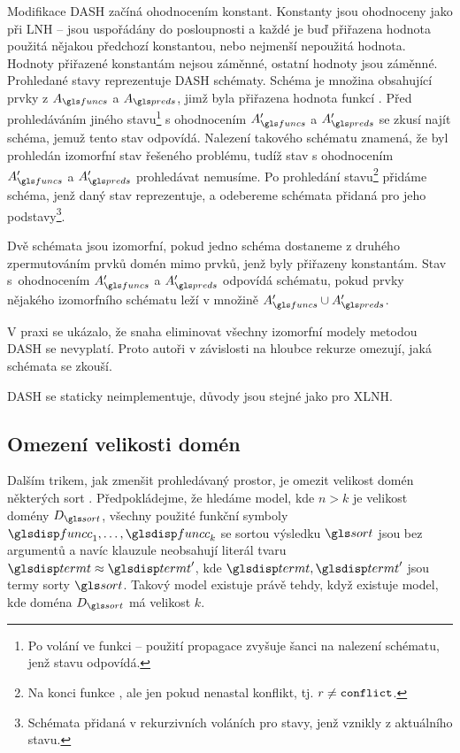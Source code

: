 Modifikace DASH začíná ohodnocením konstant.
Konstanty jsou ohodnoceny jako při LNH -- jsou uspořádány do posloupnosti
a každé je buď přiřazena hodnota použitá nějakou předchozí konstantou,
nebo nejmenší nepoužitá hodnota. Hodnoty přiřazené konstantám
nejsou záměnné, ostatní hodnoty jsou záměnné.
Prohledané stavy reprezentuje DASH schématy. Schéma je množina
obsahující prvky z $A_\funcs$ a $A_\preds$, jimž byla přiřazena
hodnota funkcí . Před prohledáváním jiného
stavu\footnote{Po volání  ve funkci  --
použití propagace zvyšuje šanci na nalezení schématu, jenž
stavu odpovídá.}
s ohodnocením $A'_\funcs$ a $A'_\preds$ se zkusí najít schéma,
jemuž tento stav odpovídá. Nalezení takového schématu znamená,
že byl prohledán izomorfní stav řešeného problému, tudíž
stav s ohodnocením $A'_\funcs$ a $A'_\preds$ prohledávat nemusíme.
Po prohledání stavu\footnote{Na konci funkce ,
ale jen pokud nenastal konflikt, tj. $r \neq \text{\texttt{conflict}}$.}
přidáme schéma, jenž daný stav reprezentuje,
a odebereme schémata přidaná pro jeho
podstavy\footnote{Schémata přidaná v rekurzivních voláních pro stavy,
jenž vznikly z aktuálního stavu.}.

Dvě schémata jsou izomorfní,
pokud jedno schéma dostaneme z druhého zpermutováním prvků domén mimo
prvků, jenž byly přiřazeny konstantám.
Stav s~ohodnocením $A'_\funcs$ a $A'_\preds$ odpovídá schématu, pokud
prvky nějakého izomorfního schématu leží v množině $A'_\funcs \cup A'_\preds$.

V praxi se ukázalo, že snaha eliminovat všechny izomorfní modely
metodou DASH se nevyplatí. Proto autoři \cite{dash}
v závislosti na hloubce rekurze  omezují,
jaká schémata se zkouší.


DASH se staticky neimplementuje, důvody jsou stejné jako pro XLNH.

\subsection{Omezení velikosti domén}

Dalším trikem, jak zmenšit prohledávaný prostor, je omezit velikost
domén ně\-kte\-rých sort \cite{claessen03paradox}.
Předpokládejme, že hledáme model, kde $n > k$
je velikost domény $D_\sort$, všechny použité funkční symboly
$\funcC_1 \comdots \funcC_k$ se sortou
výsledku $\sort$ jsou bez argumentů a navíc klauzule neobsahují literál
tvaru $\term \approx \term'$, kde $\term, \term'$ jsou termy sorty
$\sort$. Takový model existuje právě tehdy, když
existuje model, kde doména $D_\sort$ má velikost $k$.

